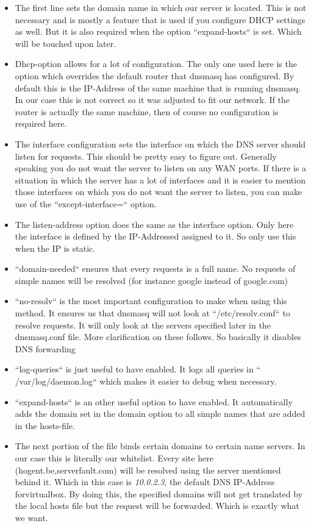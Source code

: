 \begin{itemize}
\item The first line sets the domain name in which our server is located. This is not necessary and is mostly a feature that is used if you configure DHCP settings as well. But it is also required when the option ``expand-hosts`` is set. Which will be touched upon later.
\item Dhcp-option allows for a lot of configuration. The only one used here is the option which overrides the default router that dnsmasq has configured. By default this is the IP-Address of the same machine that is running dnsmasq. In our case this is not correct so it was adjusted to fit our network. If the router is actually the same machine, then of course no configuration is required here.
\item The interface configuration sets the interface on which the DNS server should listen for requests. This should be pretty easy to figure out. Generally speaking you do not want the server to listen on any WAN ports. If there is a situation in which the server has a lot of interfaces and it is easier to mention those interfaces on which you do not want the server to listen, you can make use of the ``except-interface=`` option.
\item The listen-address option does the same as the interface option. Only here the interface is defined by the IP-Addressed assigned to it. So only use this when the IP is static.
\item ``domain-needed`` ensures that every requests is a full name. No requests of simple names will be resolved (for instance google instead of google.com)
\item ``no-resolv`` is the most important configuration to make when using this method. It ensures us that dnsmasq will not look at ``/etc/resolv.conf`` to resolve requests. It will only look at the servers specified later in the dnsmasq.conf file. More clarification on these follows. So basically it disables DNS forwarding
\item ``log-queries`` is just useful to have enabled. It logs all queries in `` /var/log/daemon.log`` which makes it easier to debug when necessary.
\item ``expand-hosts``  is an other useful option to have enabled. It automatically adds the domain set in the domain option to all simple names that are added in the hosts-file.
\item The next portion of the file binds certain domains to certain name servers. In our case this is literally our whitelist. Every site here (hogent.be,serverfault.com) will be resolved using the server mentioned behind it. Which in this case is \textit{10.0.2.3}, the default DNS IP-Address forvirtualbox. By doing this, the specified domains will not get translated by the local hosts file but the request will be forwarded. Which is exactly what we want.

\end{itemize}
